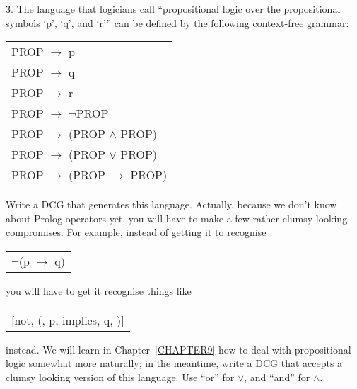 3. The language that logicians call ``propositional logic
over the propositional symbols `p', `q', and `r''' can be defined
by the following context-free grammar:
\begin{center}\begin{tabular}{l}
PROP $\rightarrow$ p \\
PROP $\rightarrow$ q \\
PROP $\rightarrow$ r \\
PROP $\rightarrow$ $\neg$PROP \\
PROP $\rightarrow$ (PROP $\wedge$ PROP) \\
PROP $\rightarrow$ (PROP $\vee$  PROP) \\
PROP $\rightarrow$ (PROP $\rightarrow$ PROP)
\end{tabular}\end{center}

Write a DCG that generates this language. Actually, because we don't
know about Prolog operators yet, you will have to make a few rather
clumsy looking compromises. For example, instead of getting it to
recognise
\begin{center}\begin{tabular}{l}$\neg$(p $\rightarrow$ q)
\end{tabular}\end{center}

you will have to get it recognise things like

\begin{center}\begin{tabular}{l}[not, (, p, implies, q, )]
\end{tabular}\end{center}
instead. We will learn in Chapter~\ref{CHAPTER9} how to deal with
propositional logic somewhat more naturally; in the meantime, write a
DCG that accepts a clumsy looking version of this language. Use
``or'' for $\vee$, and ``and'' for $\wedge$.

